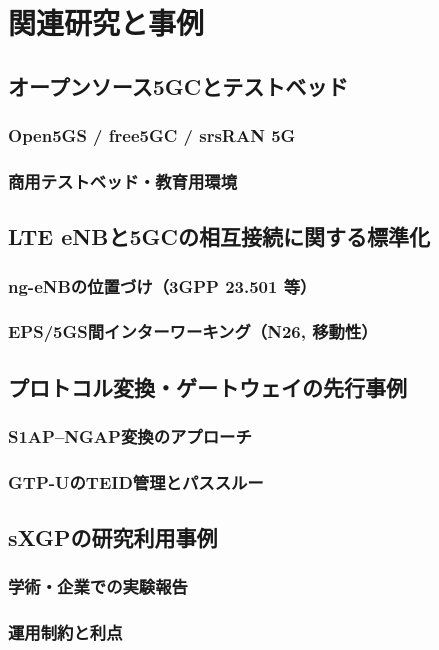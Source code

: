 \chapter{関連研究と事例}
\label{chap:related}

\section{オープンソース5GCとテストベッド}
\subsection{Open5GS / free5GC / srsRAN 5G}
\subsection{商用テストベッド・教育用環境}

\section{LTE eNBと5GCの相互接続に関する標準化}
\subsection{ng-eNBの位置づけ（3GPP 23.501 等）}
\subsection{EPS/5GS間インターワーキング（N26, 移動性）}

\section{プロトコル変換・ゲートウェイの先行事例}
\subsection{S1AP–NGAP変換のアプローチ}
\subsection{GTP-UのTEID管理とパススルー}

\section{sXGPの研究利用事例}
\subsection{学術・企業での実験報告}
\subsection{運用制約と利点}
